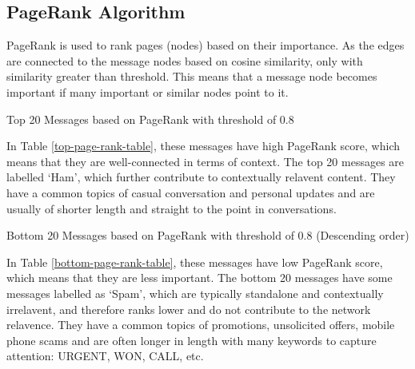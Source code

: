 \subsection{PageRank Algorithm}

PageRank is used to rank pages (nodes) based on their importance. 
As the edges are connected to the message nodes based on cosine similarity, only with similarity greater than threshold. 
This means that a message node becomes important if many important or similar nodes point to it.

\begin{table}[h]
    \centering
    \caption{Top 20 Messages based on PageRank with threshold of 0.8}
    \label{top-page-rank-table} %
\end{table}

In Table \ref{top-page-rank-table}, these messages have high PageRank score, which means that they are well-connected in terms of context. 
The top 20 messages are labelled `Ham', which further contribute to contextually relavent content.
They have a common topics of casual conversation and personal updates and are usually of shorter length and straight to the point in conversations.


\begin{landscape}
\begin{table}[h]
    \centering
    \caption{Bottom 20 Messages based on PageRank with threshold of 0.8 (Descending order)}
    \label{bottom-page-rank-table} %
\end{table}

In Table \ref{bottom-page-rank-table}, these messages have low PageRank score, which means that they are less important.
The bottom 20 messages have some messages labelled as `Spam', which are typically standalone and contextually irrelavent, and therefore ranks lower and do not contribute to the network relavence. 
They have a common topics of promotions, unsolicited offers, mobile phone scams and are often longer in length with many keywords to capture attention: URGENT, WON, CALL, etc.
\end{landscape}


